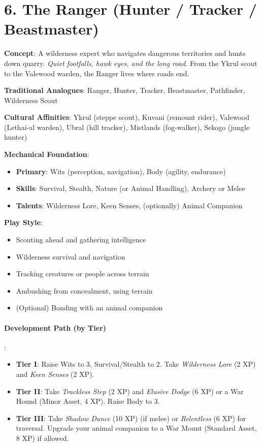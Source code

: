\section{6. The Ranger (Hunter / Tracker / Beastmaster)}
\label{sec:concept-ranger}

\textbf{Concept}: A wilderness expert who navigates dangerous territories and hunts down quarry. \emph{Quiet footfalls, hawk eyes, and the long road.} From the Ykrul scout to the Valewood warden, the Ranger lives where roads end.

\textbf{Traditional Analogues}: Ranger, Hunter, Tracker, Beastmaster, Pathfinder, Wilderness Scout

\textbf{Cultural Affinities}: Ykrul (steppe scout), Kuvani (remount rider), Valewood (Lethai-al warden), Ubral (hill tracker), Mistlands (fog-walker), Sekogo (jungle hunter)

\textbf{Mechanical Foundation}:
\begin{itemize}
\item \textbf{Primary}: Wits (perception, navigation), Body (agility, endurance)
\item \textbf{Skills}: Survival, Stealth, Nature (or Animal Handling), Archery or Melee
\item \textbf{Talents}: Wilderness Lore, Keen Senses, (optionally) Animal Companion
\end{itemize}

\textbf{Play Style}:
\begin{itemize}
\item Scouting ahead and gathering intelligence
\item Wilderness survival and navigation
\item Tracking creatures or people across terrain
\item Ambushing from concealment, using terrain
\item (Optional) Bonding with an animal companion
\end{itemize}

\paragraph{Development Path (by Tier)}:
\begin{itemize}
\item \textbf{Tier I}: Raise Wits to 3, Survival/Stealth to 2. Take \emph{Wilderness Lore} (2 XP) and \emph{Keen Senses} (2 XP).
\item \textbf{Tier II}: Take \emph{Trackless Step} (2 XP) and \emph{Elusive Dodge} (6 XP) or a War Hound (Minor Asset, 4 XP). Raise Body to 3.
\item \textbf{Tier III}: Take \emph{Shadow Dance} (10 XP) (if melee) or \emph{Relentless} (6 XP) for traversal. Upgrade your animal companion to a War Mount (Standard Asset, 8 XP) if allowed.
\end{itemize}

